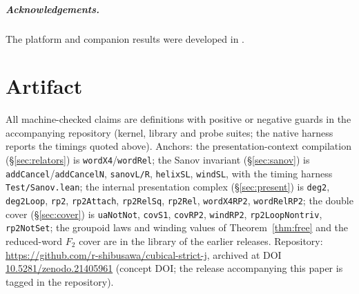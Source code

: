 \documentclass[11pt]{amsart}
\theoremstyle{definition}
\newcommand{\Ftwo}{F_2}
\begin{document}
\subparagraph*{Acknowledgements.}  The platform and companion
results were developed in \cite{Const,Sphere,Realization,Convexity}.

\section{Artifact}
\label{sec:artifact}

\sloppy
All machine-checked claims are definitions with positive or negative
guards in the accompanying repository (kernel, library and probe
suites; the native harness reports the timings quoted above).
Anchors: the presentation-context compilation
(\S\ref{sec:relators}) is \texttt{wordX4}/\texttt{wordRel}; the
Sanov invariant (\S\ref{sec:sanov}) is
\texttt{addCancel}/\texttt{addCancelN}, \texttt{sanovL/R},
\texttt{helixSL}, \texttt{windSL}, with the timing harness
\texttt{Test/Sanov.lean}; the internal presentation complex
(\S\ref{sec:present}) is \texttt{deg2}, \texttt{deg2Loop},
\texttt{rp2}, \texttt{rp2Attach}, \texttt{rp2RelSq},
\texttt{rp2Rel}, \texttt{wordX4RP2}, \texttt{wordRelRP2}; the double
cover (\S\ref{sec:cover}) is \texttt{uaNotNot}, \texttt{covS1},
\texttt{covRP2}, \texttt{windRP2}, \texttt{rp2LoopNontriv},
\texttt{rp2NotSet}; the groupoid laws and winding values of
Theorem~\ref{thm:free} and the reduced-word $\Ftwo$ cover are in the
library of the earlier releases.  Repository:
\url{https://github.com/r-shibusawa/cubical-strict-j}, archived at
DOI \href{https://doi.org/10.5281/zenodo.21405961}%
{10.5281/zenodo.21405961} (concept DOI; the release accompanying
this paper is tagged in the repository).
\end{document}
